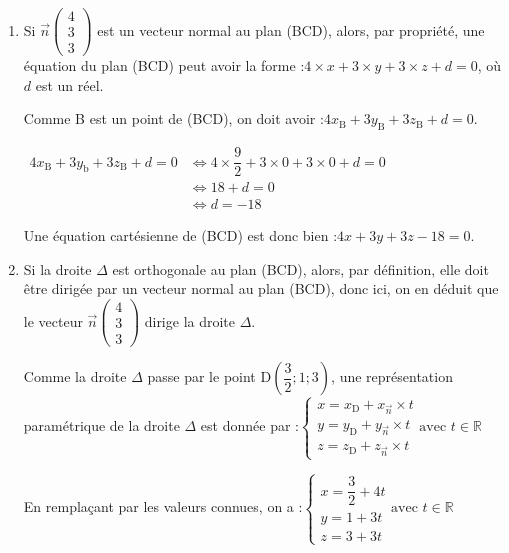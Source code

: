 \documentclass[10pt]{article}
\providecommand{\R}{\mathbb{R}}
\providecommand{\vect}[1]{\overrightarrow{#1}}
\begin{document}
\begin{enumerate}
\begin{enumerate}
		
		\item Si $\vect{n}\begin{pmatrix} 4\\3\\3 \end{pmatrix}$ est un vecteur normal au plan  (BCD), alors, par propriété, une équation du plan  (BCD) peut avoir la forme :\quad $4\times x + 3 \times y + 3 \times z + d = 0$, \quad où $d$ est un réel.
		
		Comme B est un point de (BCD), on doit avoir :\quad $4x_{\mathrm{B}} +3 y_{\mathrm{B}} + 3z_{\mathrm{B}} + d =0$.
		
		$\begin{aligned}
			4x_{\mathrm{B}} +3 y_{\mathrm{b}} + 3z_{\mathrm{B}} + d =0
			&\iff 4 \times \dfrac{9}{2} +3 \times 0 +3\times 0 +  d= 0\\
			&\iff 18 + d = 0\\
			&\iff d = -18
		\end{aligned}		$
		
		Une équation cartésienne de (BCD) est donc bien :\quad $4x+3y+3z - 18 = 0$.

		
		\item 
		Si la droite $\Delta$ est orthogonale au plan (BCD), alors, par définition, elle doit être dirigée par un vecteur normal au plan (BCD), donc ici, on en déduit que le vecteur $\vect{n} \begin{pmatrix} 4\\3\\3 \end{pmatrix}$ dirige la droite $\Delta$.
		
		Comme la droite $\Delta$ passe par le point D$\left(\dfrac{3}{2} ; 1 ; 3\right)$, une représentation paramétrique de la droite $\Delta$ est donnée par :\quad $\begin{cases}
			x=x_{\mathrm{D}} + x_{\vect{n}}\times t\\
			y=y_{\mathrm{D}} + y_{\vect{n}}\times t\\
			z=z_{\mathrm{D}} + z_{\vect{n}}\times t
		\end{cases}\text{avec } t \in \R$
		
		En remplaçant par les valeurs connues, on a :\quad $\begin{cases}
			x=\dfrac{3}{2} +4 t\\
			y=1 +3t\\
			z=3+3t
		\end{cases}\text{avec } t \in \R$
		
		
		

\end{enumerate}
\end{enumerate}
\end{document}
